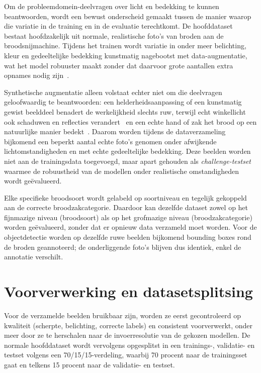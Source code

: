 Om de probleemdomein-deelvragen over licht en bedekking te kunnen beantwoorden, wordt
een bewust onderscheid gemaakt tussen de manier waarop die variatie in de training en
in de evaluatie terechtkomt. De hoofddataset bestaat hoofdzakelijk uit normale,
realistische foto's van broden aan de broodsnijmachine. Tijdens het trainen wordt
variatie in onder meer belichting, kleur en gedeeltelijke bedekking kunstmatig
nagebootst met data-augmentatie, wat het model robuuster maakt zonder dat daarvoor
grote aantallen extra opnames nodig zijn~\autocite{Shorten2019}.

Synthetische augmentatie alleen volstaat echter niet om die deelvragen geloofwaardig
te beantwoorden: een helderheidsaanpassing of een kunstmatig gewist beelddeel
benadert de werkelijkheid slechts ruw, terwijl echt winkellicht ook schaduwen en
reflecties verandert~\autocite{Olakanmi2023} en een echte hand of zak het brood op
een natuurlijke manier bedekt~\autocite{Ciapas2023}. Daarom worden tijdens de
dataverzameling bijkomend een beperkt aantal echte foto's genomen onder afwijkende
lichtomstandigheden en met echte gedeeltelijke bedekking. Deze beelden worden niet aan
de trainingsdata toegevoegd, maar apart gehouden als \emph{challenge-testset} waarmee
de robuustheid van de modellen onder realistische omstandigheden wordt geëvalueerd.

Elke specifieke broodsoort wordt gelabeld op soortniveau en tegelijk gekoppeld aan de
correcte broodzakcategorie. Daardoor kan dezelfde dataset zowel op het fijnmazige
niveau (broodsoort) als op het grofmazige niveau (broodzakcategorie) worden
geëvalueerd, zonder dat er opnieuw data verzameld moet worden. Voor de objectdetectie
worden op dezelfde ruwe beelden bijkomend bounding boxes rond de broden geannoteerd;
de onderliggende foto's blijven dus identiek, enkel de annotatie verschilt.

\section{Voorverwerking en datasetsplitsing}

Voor de verzamelde beelden bruikbaar zijn, worden ze eerst gecontroleerd op
kwaliteit (scherpte, belichting, correcte labels) en consistent voorverwerkt, onder
meer door ze te herschalen naar de invoerresolutie van de gekozen modellen. De normale
hoofddataset wordt vervolgens opgesplitst in een trainings-, validatie- en testset
volgens een 70/15/15-verdeling, waarbij 70 procent naar de trainingsset gaat en
telkens 15 procent naar de validatie- en testset.

